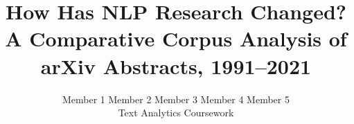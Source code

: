 
\documentclass[11pt]{article}

\usepackage[review]{acl}

\usepackage{times}
\usepackage{latexsym}
\usepackage[T1]{fontenc}
\usepackage[utf8]{inputenc}
\usepackage{microtype}
\usepackage{inconsolata}
\usepackage{graphicx}

\usepackage{amsmath}    %
\usepackage{booktabs}   %

\graphicspath{{figures/}}

\usepackage{xcolor}
\newcommand{\TODO}[2]{%
  \par\noindent\colorbox{yellow!30}{\parbox{\linewidth}{%
    \textbf{[#1]}\quad\textit{\small Target: #2 words}}}%
  \par\medskip}

\title{How Has NLP Research Changed? A Comparative Corpus Analysis
       of arXiv Abstracts, 1991--2021}

\author{Member 1 \And Member 2 \And Member 3 \And Member 4 \And Member 5 \\
        Text Analytics Coursework}


